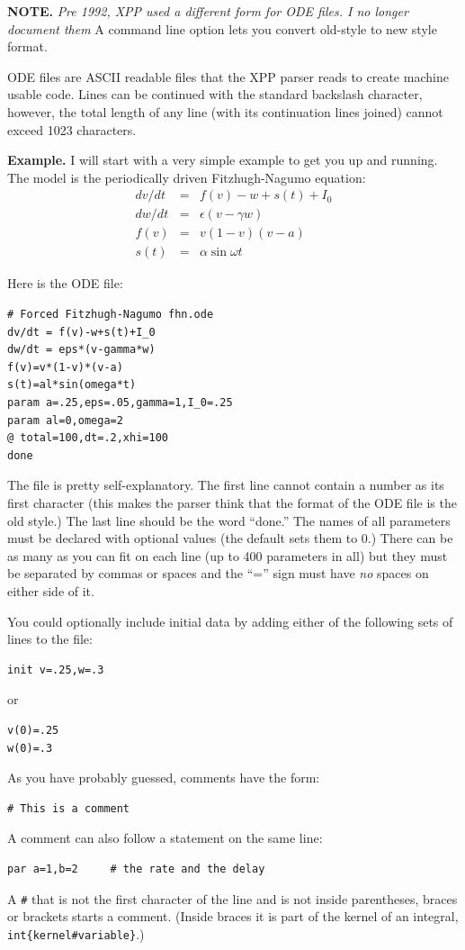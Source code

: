 \documentclass{article}
\newcommand{\beqa}{\begin{eqnarray}}
\newcommand{\eeqa}{\end{eqnarray}}
\newcommand{\tc}[1]{\addcontentsline{toc}{subsection}{#1}}
\begin{document}
{\bf NOTE.}  {\em Pre 1992, XPP used a different form for ODE files. I no longer document them}  A command line option lets you convert old-style to
new style format.


ODE files are ASCII readable files that the XPP parser reads to create
 machine usable code. Lines can be continued with the standard
backslash character, however, the total length of any line (with its
continuation lines joined) cannot exceed 1023 characters.

\bigskip
\tc{Example}
{\bf Example.} 
I will start with a very simple example to get you up and running. The
model is the periodically driven Fitzhugh-Nagumo equation:
\beqa
dv/dt &=& f(v)-w+s(t)+I_0 \\
dw/dt &=& \epsilon(v-\gamma w) \\
f(v) &=& v(1-v)(v-a) \\
s(t) &=& \alpha \sin \omega t
\eeqa

Here is the ODE file:
\begin{verbatim}
# Forced Fitzhugh-Nagumo fhn.ode 
dv/dt = f(v)-w+s(t)+I_0
dw/dt = eps*(v-gamma*w)
f(v)=v*(1-v)*(v-a)
s(t)=al*sin(omega*t)
param a=.25,eps=.05,gamma=1,I_0=.25
param al=0,omega=2
@ total=100,dt=.2,xhi=100
done
\end{verbatim}

The file is pretty self-explanatory.  The first line cannot contain a
number as its first character (this makes the parser think that the
format of the ODE file is the old style.)  The last line should be the
word ``done.''  The names of all parameters must be declared with
optional values (the default sets them to 0.) There can be as many as
you can fit on each line (up to 400 parameters in all) but they must be
separated by commas or spaces and the ``='' sign must have {\em no} spaces on
either side of it.  

You could optionally include initial data by adding either of the
following sets of lines to the file:
\begin{verbatim}
init v=.25,w=.3
\end{verbatim}
or
\begin{verbatim}
v(0)=.25
w(0)=.3
\end{verbatim}

As you have probably guessed, comments have the form:
\begin{verbatim}
# This is a comment
\end{verbatim}
A comment can also follow a statement on the same line:
\begin{verbatim}
par a=1,b=2     # the rate and the delay
\end{verbatim}
A \verb|#| that is not the first character of the line and is not inside parentheses, braces or brackets
starts a comment.  (Inside braces it is part of the kernel of an integral, {\tt int\{kernel\#variable\}}.)
\end{document}
